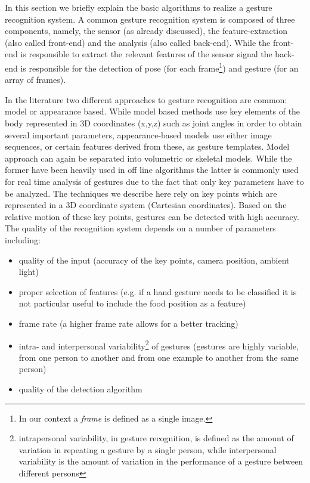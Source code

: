 \documentclass[titlepage,12pt,a4paper]{article}
\begin{document}
In this section we briefly explain the basic algorithms to realize a gesture recognition system. A common gesture recognition system is composed of three components, namely, the sensor (as already discussed), the feature-extraction (also called front-end) and the analysis (also called back-end). While the front-end is responsible to extract the relevant features of the sensor signal the back-end is responsible for the detection of pose (for each frame\footnote{In our context a \emph{frame} is defined as a single image.}) and gesture (for an array of frames).

In the literature two different approaches to gesture recognition are common: model or appearance based. While model based methods use key elements of the body represented in 3D coordinates (x,y,z) such as joint angles in order to obtain several important parameters, appearance-based models use either image sequences, or certain features derived from these, as gesture templates. Model approach can again be separated into volumetric or skeletal models. While the former have been heavily used in off line algorithms the latter is commonly used for real time analysis of gestures due to the fact that only key parameters have to be analyzed. The techniques we describe here rely on key points which are represented in a 3D coordinate system (Cartesian coordinates). Based on the relative motion of these key points, gestures can be detected with high accuracy. The quality of the recognition system depends on a number of parameters including:
\begin{itemize}
	\item quality of the input (accuracy of the key points, camera position, ambient light)
	\item proper selection of features (e.g. if a hand gesture needs to be classified it is not particular useful to include the food position as a feature)
	\item frame rate (a higher frame rate allows for a better tracking)
	\item intra- and interpersonal variability\footnote{intrapersonal variability, in gesture recognition, is defined as the amount of variation in repeating a gesture by a single person, while interpersonal variability is the amount of variation in the performance of a gesture between different persons} of gestures (gestures are highly variable, from one person to another and from one example to another from the same person)
	\item quality of the detection algorithm
\end{itemize}
\end{document}

